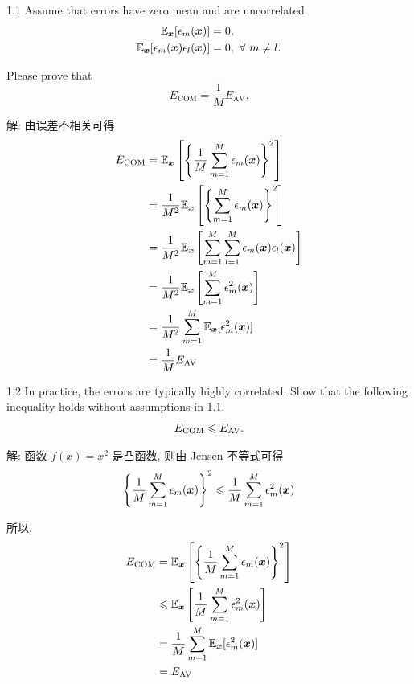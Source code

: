 \documentclass{article}
\begin{document}
1.1 Assume that errors have zero mean and are uncorrelated
\begin{equation}
  \begin{aligned}
    \mathbb{E}_{\bm{x}}[\epsilon_{m}(\bm{x})]&=0, \\
    \mathbb{E}_{\bm{x}}[\epsilon_{m}(\bm{x})\epsilon_{l}(\bm{x})]&=0,~\forall~m\neq l.
  \end{aligned}
\end{equation}

Please prove that
\begin{equation}
  E_{\text{COM}}=\frac{1}{M}E_{\text{AV}}.
\end{equation}

解: 由误差不相关可得
\begin{equation}
  \begin{aligned}
    E_{\text{COM}}
    &=\mathbb{E}_{\bm{x}}\left[\left\{\frac{1}{M}\sum_{m=1}^{M}\epsilon_{m}(\bm{x})\right\}^{2}\right]\\
    &=\frac{1}{M^2}\mathbb{E}_{\bm{x}}\left[\left\{\sum_{m=1}^{M}\epsilon_{m}(\bm{x})\right\}^{2}\right]\\
    &=\frac{1}{M^2}\mathbb{E}_{\bm{x}}\left[\sum_{m=1}^{M}\sum_{l=1}^{M}\epsilon_{m}(\bm{x})\epsilon_{l}(\bm{x})\right]\\
    &=\frac{1}{M^2}\mathbb{E}_{\bm{x}}\left[\sum_{m=1}^{M}\epsilon_{m}^2(\bm{x})\right]\\
    &=\frac{1}{M^2}\sum_{m=1}^{M}\mathbb{E}_{\bm{x}}[\epsilon_{m}^2(\bm{x})]\\
    &=\frac{1}{M}E_{\text{AV}}\\
  \end{aligned}
\end{equation}

1.2 In practice, the errors are typically highly correlated. Show that the following inequality holds without assumptions in 1.1.
\begin{equation}
  E_{\text{COM}}\leqslant E_{\text{AV}}.
  \label{eq:inequality}
\end{equation}

解: 函数 $f(x)=x^2$ 是凸函数, 则由 Jensen 不等式可得
\begin{equation}
  \left\{\frac{1}{M}\sum_{m=1}^{M}\epsilon_{m}(\bm{x})\right\}^{2}
  \leqslant
  \frac{1}{M}\sum_{m=1}^{M}\epsilon^{2}_{m}(\bm{x})
\end{equation}

所以,
\begin{equation}
  \begin{aligned}
    E_{\text{COM}}
    &=\mathbb{E}_{\bm{x}}\left[\left\{\frac{1}{M}\sum_{m=1}^{M}\epsilon_{m}(\bm{x})\right\}^{2}\right]\\
    &\leqslant\mathbb{E}_{\bm{x}}\left[\frac{1}{M}\sum_{m=1}^{M}\epsilon^{2}_{m}(\bm{x})\right]\\
    &=\frac{1}{M}\sum_{m=1}^{M}\mathbb{E}_{\bm{x}}[\epsilon^{2}_{m}(\bm{x})]\\
    &=E_{\text{AV}}
  \end{aligned}
\end{equation}
\end{document}
